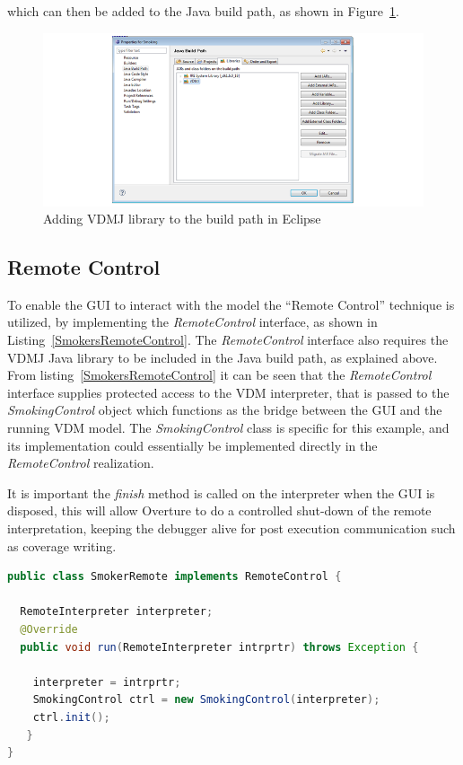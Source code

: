 \documentclass{overturerepchap}
\begin{document}
\noindent which can then be added to the Java build path, as shown in Figure~\ref{fig:gui:VDMJBuildPath}. 

\begin{figure}[h]
\begin{center}
  \includegraphics[width=\textwidth]{figures/SmokersVDMJBuildPath}
  \caption[labelInTOC]{Adding VDMJ library to the build path in Eclipse}
  \label{fig:gui:VDMJBuildPath}
\end{center}
\end{figure}

\newpage
\subsection{Remote Control}
To enable the GUI to interact with the model the ``Remote Control'' technique is utilized, by implementing the \textit{RemoteControl} interface, as shown in Listing~\ref{SmokersRemoteControl}. The \textit{RemoteControl} interface also requires the VDMJ Java library to be included in the Java build path, as explained above. From listing~\ref{SmokersRemoteControl} it can be seen that the \textit{RemoteControl} interface supplies protected access to the VDM interpreter, that is passed to the \textit{SmokingControl} object which functions as the bridge between the GUI and the running VDM model. The \textit{SmokingControl} class is specific for this example, and its implementation could essentially be implemented directly in the \textit{RemoteControl} realization. 

It is important the \textit{finish} method is called on the interpreter when the GUI is disposed, this will allow Overture to do a controlled shut-down of the remote interpretation, keeping the debugger alive for post execution communication such as coverage writing.  

\begin{lstlisting}[language=Java,label=SmokersRemoteControl,caption=Java implementation of the RemoteControl interface, captionpos=b]
public class SmokerRemote implements RemoteControl {

  RemoteInterpreter interpreter;
  @Override
  public void run(RemoteInterpreter intrprtr) throws Exception {
	
    interpreter = intrprtr;
    SmokingControl ctrl = new SmokingControl(interpreter);  
    ctrl.init();
   }
}
\end{lstlisting}
\end{document}
